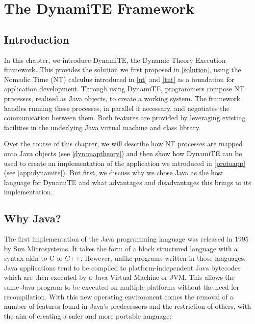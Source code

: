 
\chapter{The DynamiTE Framework}
\label{dynamite}

\section{Introduction}

In this chapter, we introduce DynamiTE, the Dynamic Theory Execution
framework.  This provides the solution we first proposed in
\ref{solution}, using the Nomadic Time (NT) calculus introduced in
\ref{nt} and \ref{tnt} as a foundation for application development.
Through using DynamiTE, programmers compose NT processes, realised as
Java objects, to create a working system.  The framework handles
running these processes, in parallel if necessary, and negotiates the
communication between them.  Both features are provided by leveraging
existing facilities in the underlying Java virtual machine and class
library.

Over the course of this chapter, we will describe how NT processes are
mapped onto Java objects (see \ref{dyn:maptheory}) and then show how
DynamiTE can be used to create an implementation of the application we
introduced in \ref{protoapp} (see \ref{app:dynamite}).  But first, we
discuss why we chose Java as the host language for DynamiTE and what
advantages and disadvantages this brings to its implementation.

\section{Why Java?}

The first implementation of the Java programming language was released
in 1995 by Sun Microsystems.  It takes the form of a block structured
language with a syntax akin to C or C++.  However, unlike programs
written in those languages, Java applications tend to be compiled to
platform-independent Java bytecodes which are then executed by a Java
Virtual Machine or JVM.  This allows the same Java program to be
executed on multiple platforms without the need for recompilation.
With this new operating environment comes the removal of a number of
features found in Java's predecessors and the restriction of others,
with the aim of creating a safer and more portable language:

